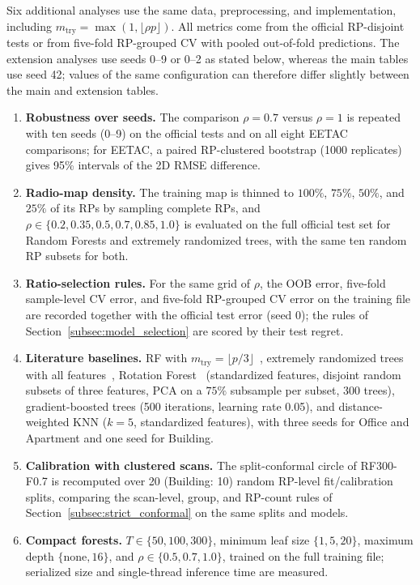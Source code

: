 Six additional analyses use the same data, preprocessing, and implementation, including $m_{\mathrm{try}}=\max(1,\lfloor\rho p\rfloor)$. All metrics come from the official RP-disjoint tests or from five-fold RP-grouped CV with pooled out-of-fold predictions. The extension analyses use seeds 0--9 or 0--2 as stated below, whereas the main tables use seed 42; values of the same configuration can therefore differ slightly between the main and extension tables.

\begin{enumerate}
	\item \textbf{Robustness over seeds.} The comparison $\rho=0.7$ versus $\rho=1$ is repeated with ten seeds (0--9) on the official tests and on all eight EETAC comparisons; for EETAC, a paired RP-clustered bootstrap (1000 replicates) gives 95\% intervals of the 2D RMSE difference.
	\item \textbf{Radio-map density.} The training map is thinned to $100\%$, $75\%$, $50\%$, and $25\%$ of its RPs by sampling complete RPs, and $\rho\in\{0.2,0.35,0.5,0.7,0.85,1.0\}$ is evaluated on the full official test set for Random Forests and extremely randomized trees, with the same ten random RP subsets for both.
	\item \textbf{Ratio-selection rules.} For the same grid of $\rho$, the OOB error, five-fold sample-level CV error, and five-fold RP-grouped CV error on the training file are recorded together with the official test error (seed 0); the rules of Section~\ref{subsec:model_selection} are scored by their test regret.
	\item \textbf{Literature baselines.} RF with $m_{\mathrm{try}}=\lfloor p/3\rfloor$~\cite{breiman2001random}, extremely randomized trees with all features~\cite{geurts2006extremely}, Rotation Forest~\cite{rodriguez2006rotation} (standardized features, disjoint random subsets of three features, PCA on a $75\%$ subsample per subset, 300 trees), gradient-boosted trees (500 iterations, learning rate 0.05), and distance-weighted KNN ($k=5$, standardized features), with three seeds for Office and Apartment and one seed for Building.
	\item \textbf{Calibration with clustered scans.} The split-conformal circle of RF300-F0.7 is recomputed over 20 (Building: 10) random RP-level fit/calibration splits, comparing the scan-level, group, and RP-count rules of Section~\ref{subsec:strict_conformal} on the same splits and models.
	\item \textbf{Compact forests.} $T\in\{50,100,300\}$, minimum leaf size $\{1,5,20\}$, maximum depth $\{\text{none},16\}$, and $\rho\in\{0.5,0.7,1.0\}$, trained on the full training file; serialized size and single-thread inference time are measured.
\end{enumerate}

